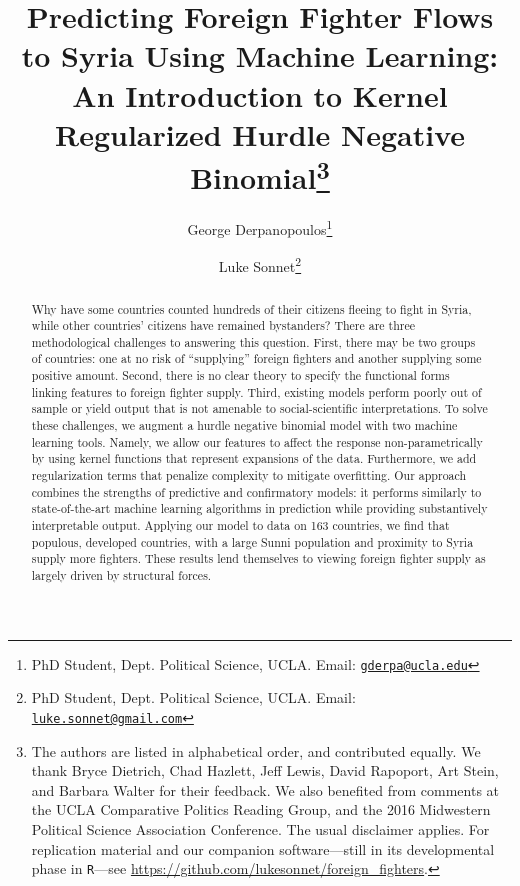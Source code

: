 \documentclass[12pt]{article}
\begin{document}
\title{Predicting Foreign Fighter Flows to Syria Using Machine Learning: An Introduction to Kernel Regularized Hurdle Negative Binomial\thanks{The authors are listed in alphabetical order, and contributed equally. We thank Bryce Dietrich, Chad Hazlett, Jeff Lewis, David Rapoport, Art Stein, and Barbara Walter for their feedback. We also benefited from comments at the UCLA Comparative Politics Reading Group, and the 2016 Midwestern Political Science Association Conference. The usual disclaimer applies. For replication material and our companion software---still in its developmental phase in \texttt{R}---see \href{https://github.com/lukesonnet/foreign_fighters}{https://github.com/lukesonnet/foreign\_fighters}.}}

\author{George Derpanopoulos\thanks{PhD Student, Dept. Political Science, UCLA. Email: \href{mailto:gderpa@ucla.edu}{\tt gderpa@ucla.edu}} \and Luke Sonnet\thanks{PhD Student, Dept. Political Science, UCLA. Email: \href{mailto:luke.sonnet@gmail.com}{\tt luke.sonnet@gmail.com}}}

	\maketitle
	\thispagestyle{empty} 
	\singlespacing

\begin{abstract}	
Why have some countries counted hundreds of their citizens fleeing to fight in Syria, while other countries' citizens have remained bystanders? There are three methodological challenges to answering this question. First, there may be two groups of countries: one at no risk of ``supplying'' foreign fighters and another supplying some positive amount. Second, there is no clear theory to specify the functional forms linking features to foreign fighter supply. Third, existing models perform poorly out of sample or yield output that is not amenable to social-scientific interpretations. To solve these challenges, we augment a hurdle negative binomial model with two machine learning tools. Namely, we allow our features to affect the response non-parametrically by using kernel functions that represent expansions of the data. Furthermore, we add regularization terms that penalize complexity to mitigate overfitting. Our approach combines the strengths of predictive and confirmatory models: it performs similarly to state-of-the-art machine learning algorithms in prediction while providing substantively interpretable output.  Applying our model to data on 163 countries, we find that populous, developed countries, with a large Sunni population and proximity to Syria supply more fighters. These results lend themselves to viewing foreign fighter supply as largely driven by structural forces.
\end{abstract}
\end{document}
